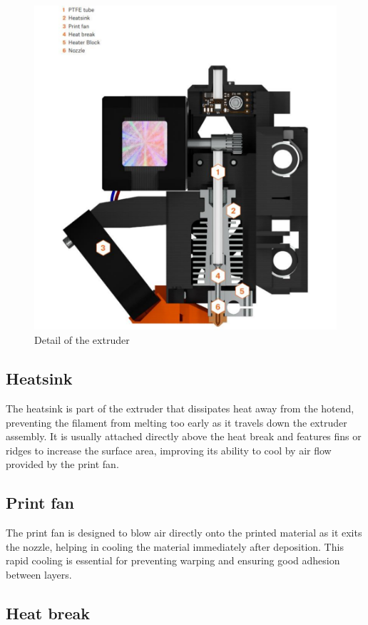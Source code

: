 \begin{figure}[ht]
    \centering
    \includegraphics[width=0.8\linewidth]{img/extruder_prusa}
    \caption{Detail of the extruder}
    \label{fig:extruder} 
\end{figure}

\subsection{Heatsink}

The heatsink is part of the extruder that dissipates heat away from the hotend, preventing the filament from melting too early as it travels down the extruder assembly. It is usually attached directly above the heat break and features fins or ridges to increase the surface area, improving its ability to cool by air flow provided by the print fan.

\subsection{Print fan}

The print fan is designed to blow air directly onto the printed material as it exits the nozzle, helping in cooling the material immediately after deposition. This rapid cooling is essential for preventing warping and ensuring good adhesion between layers.

\subsection{Heat break}

